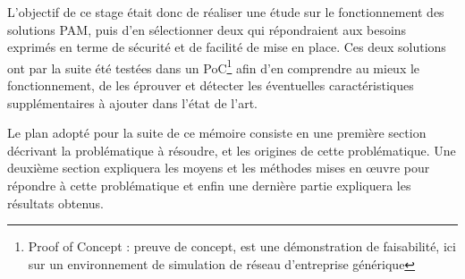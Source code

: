 L'objectif de ce stage était donc de réaliser une étude sur le fonctionnement des solutions PAM, puis d'en sélectionner deux qui répondraient aux besoins exprimés en terme de sécurité et de facilité de mise en place. Ces deux solutions ont par la suite été testées dans un PoC\footnote{Proof of Concept : preuve de concept, est une démonstration de faisabilité, ici sur un environnement de simulation de réseau d'entreprise générique} afin d'en comprendre au mieux le fonctionnement, de les éprouver et détecter les éventuelles caractéristiques supplémentaires à ajouter dans l'état de l'art.

Le plan adopté pour la suite de ce mémoire consiste en une première section décrivant la problématique à résoudre, et les origines de cette problématique. Une deuxième section expliquera les moyens et les méthodes mises en œuvre pour répondre à cette problématique et enfin une dernière partie expliquera les résultats obtenus.